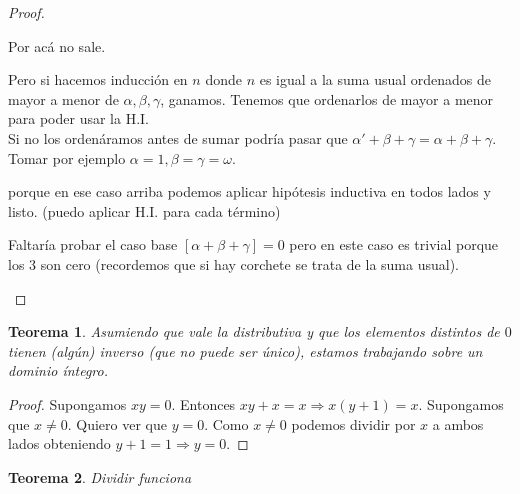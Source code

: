 \documentclass[10pt,a4paper,final]{report}
\newtheorem{theorem}{Teorema}
\def\key#1{\{#1\}}
\begin{document}
\begin{proof}
\begin{itemize}

Por acá no sale.


Pero si hacemos inducción en $n$ donde $n$ es igual a la suma usual ordenados de mayor a menor de $\alpha,\beta,\gamma$, ganamos. Tenemos que ordenarlos de mayor a menor para poder usar la H.I.\\

Si no los ordenáramos antes de sumar podría pasar que $\alpha'+\beta + \gamma = \alpha + \beta + \gamma$. Tomar por ejemplo $\alpha=1, \beta = \gamma = \omega$.

 porque en ese caso arriba podemos aplicar hipótesis inductiva en todos lados y listo. (puedo aplicar H.I. para cada término)



Faltaría probar el caso base $[\alpha + \beta + \gamma] = 0$ pero en este caso es trivial porque los 3 son cero (recordemos que si hay corchete se trata de la suma usual).

\end{itemize}

\end{proof}

\begin{theorem}
	Asumiendo que vale la distributiva y que los elementos distintos de $0$ tienen (algún) inverso (que no puede ser único), estamos trabajando sobre un dominio íntegro.
\end{theorem}

\begin{proof}
	Supongamos $xy = 0$. Entonces $xy+x = x \Rightarrow x(y+1) = x$. Supongamos que $x\neq0$. Quiero ver que $y=0$. Como $x\neq0$ podemos dividir por $x$ a ambos lados obteniendo $y+1=1 \Rightarrow y=0$.
\end{proof}


\begin{theorem}
	Dividir funciona
\end{theorem}
\end{document}
